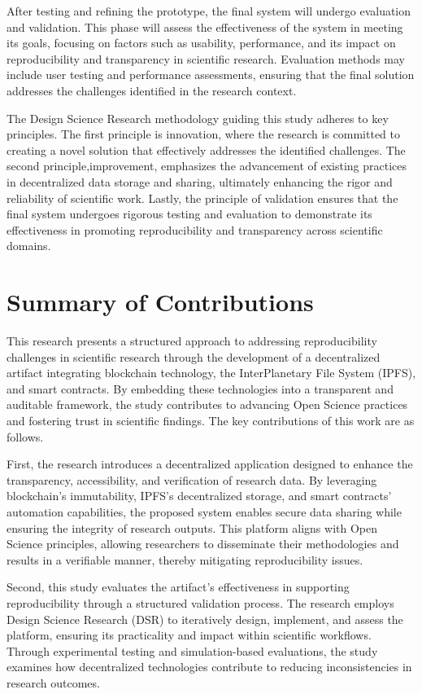 \documentclass{article}
\begin{document}
After testing and refining the prototype, the final system will undergo evaluation and validation. This phase will assess the effectiveness of the system in meeting its goals, focusing on factors such as usability, performance, and its impact on reproducibility and transparency in scientific research. Evaluation methods may include user testing and performance assessments, ensuring that the final solution addresses the challenges identified in the research context.

The Design Science Research methodology guiding this study adheres to key principles. The first principle is innovation, where the research is committed to creating a novel solution that effectively addresses the identified challenges. The second principle,improvement, emphasizes the advancement of existing practices in decentralized data storage and sharing, ultimately enhancing the rigor and reliability of scientific work. Lastly, the principle of validation ensures that the final system undergoes rigorous testing and evaluation to demonstrate its effectiveness in promoting reproducibility and transparency across scientific domains.

\section{Summary of Contributions}

This research presents a structured approach to addressing reproducibility challenges in scientific research through the development of a decentralized artifact integrating blockchain technology, the InterPlanetary File System (IPFS), and smart contracts. By embedding these technologies into a transparent and auditable framework, the study contributes to advancing Open Science practices and fostering trust in scientific findings. The key contributions of this work are as follows.

First, the research introduces a decentralized application designed to enhance the transparency, accessibility, and verification of research data. By leveraging blockchain's immutability, IPFS’s decentralized storage, and smart contracts’ automation capabilities, the proposed system enables secure data sharing while ensuring the integrity of research outputs. This platform aligns with Open Science principles, allowing researchers to disseminate their methodologies and results in a verifiable manner, thereby mitigating reproducibility issues.

Second, this study evaluates the artifact’s effectiveness in supporting reproducibility through a structured validation process. The research employs Design Science Research (DSR) to iteratively design, implement, and assess the platform, ensuring its practicality and impact within scientific workflows. Through experimental testing and simulation-based evaluations, the study examines how decentralized technologies contribute to reducing inconsistencies in research outcomes.
\end{document}
